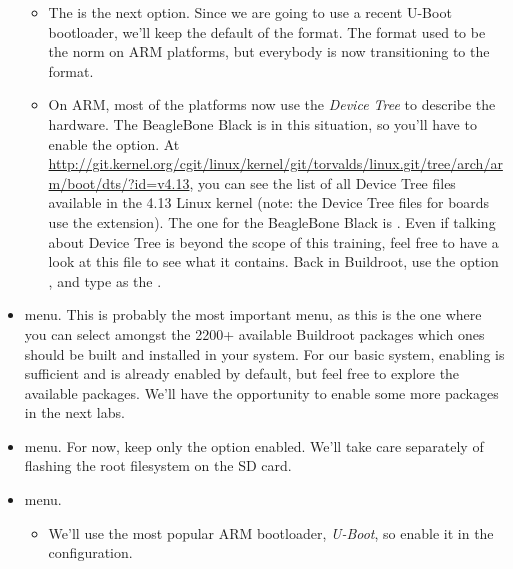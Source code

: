 \begin{itemize}
\begin{itemize}
  \item The  is the next option. Since we
    are going to use a recent U-Boot bootloader, we'll keep the
    default of the  format. The  format used
    to be the norm on ARM platforms, but everybody is now
    transitioning to the  format.

  \item On ARM, most of the platforms now use the {\em Device Tree} to
    describe the hardware. The BeagleBone Black is in this situation,
    so you'll have to enable the 
    option. At
    \url{http://git.kernel.org/cgit/linux/kernel/git/torvalds/linux.git/tree/arch/arm/boot/dts/?id=v4.13},
    you can see the list of all Device Tree files available in the 4.13
    Linux kernel (note: the Device Tree files for boards use the
     extension). The one for the BeagleBone Black is
    . Even if talking about Device Tree is
    beyond the scope of this training, feel free to have a look at
    this file to see what it contains. Back in Buildroot, use the
    option , and type
     as the .

  \end{itemize}

\item {} menu. This is probably the most important
  menu, as this is the one where you can select amongst the 2200+
  available Buildroot packages which ones should be built and
  installed in your system. For our basic system, enabling
   is sufficient and is already enabled by default, but
  feel free to explore the available packages. We'll have the
  opportunity to enable some more packages in the next labs.

\item {} menu. For now, keep only the  option enabled. We'll take care separately of
  flashing the root filesystem on the SD card.

\item {} menu.

  \begin{itemize}

  \item We'll use the most popular ARM bootloader, {\em U-Boot}, so
    enable it in the configuration.


\end{itemize}
\end{itemize}
